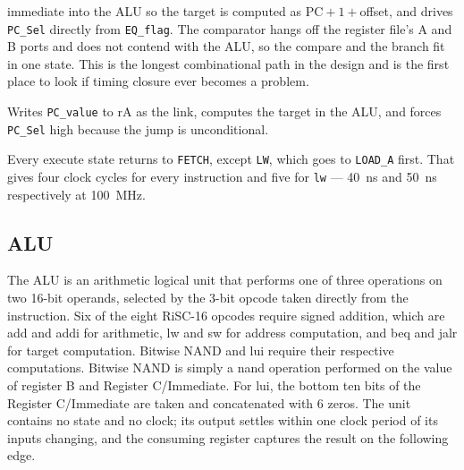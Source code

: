 \documentclass[11pt,letterpaper]{article}
\begin{document}
\begin{description}
    immediate into the ALU so the target is computed as PC${}+{}1+{}$offset,
    and drives \texttt{PC\_Sel} directly from \texttt{EQ\_flag}. The comparator
    hangs off the register file's A and B ports and does not contend with the
    ALU, so the compare and the branch fit in one state. This is the longest
    combinational path in the design and is the first place to look if timing
    closure ever becomes a problem.
  \item[\texttt{JALR}] Writes \texttt{PC\_value} to rA as the link, computes
    the target in the ALU, and forces \texttt{PC\_Sel} high because the jump is
    unconditional.
\end{description}

Every execute state returns to \texttt{FETCH}, except \texttt{LW}, which goes
to \texttt{LOAD\_A} first. That gives four clock cycles for every instruction
and five for \texttt{lw} --- 40~ns and 50~ns respectively at 100~MHz.


\subsection{ALU}
The ALU is an arithmetic logical unit that performs one of three operations on two 16-bit operands, selected by the 3-bit opcode taken directly from the instruction. Six of the eight RiSC-16 opcodes require signed addition, which are add and addi for arithmetic, lw and sw for address computation, and beq and jalr for target computation. Bitwise NAND and lui require their respective computations. Bitwise NAND is simply a nand operation performed on the value of register B and Register C/Immediate. For lui, the bottom ten bits of the Register C/Immediate are taken and concatenated with 6 zeros. The unit contains no state and no clock; its output settles within one clock period of its inputs changing, and the consuming register captures the result on the following edge.
\end{document}
